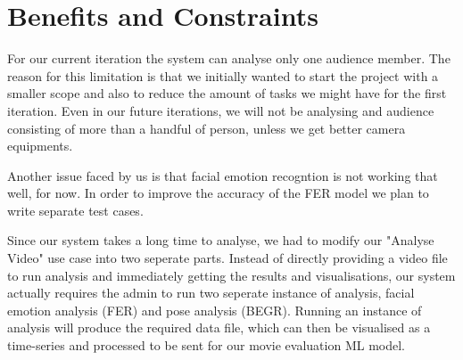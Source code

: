 \documentclass[12pt,a4paper,man]{report}
\begin{document}
\chapter{Benefits and Constraints}
\label{sec:orge79fc79}
For our current iteration the system can analyse only one audience member. The reason for this limitation is that we initially wanted to start the project with a smaller scope and also to reduce the amount of tasks we might have for the first iteration. Even in our future iterations, we will not be analysing and audience consisting of more than a handful of person, unless we get better camera equipments.

Another issue faced by us is that facial emotion recogntion is not working that well, for now. In order to improve the accuracy of the \gls{FER} model we plan to write separate test cases.

Since our system takes a long time to analyse, we had to modify our "Analyse Video" use case into two seperate parts. Instead of directly providing a video file to run analysis and immediately getting the results and visualisations, our system actually requires the admin to run two seperate instance of analysis, facial emotion analysis (FER) and pose analysis (BEGR). Running an instance of analysis will produce the required data file, which can then be visualised as a time-series and processed to be sent for our movie evaluation ML model.
\end{document}
